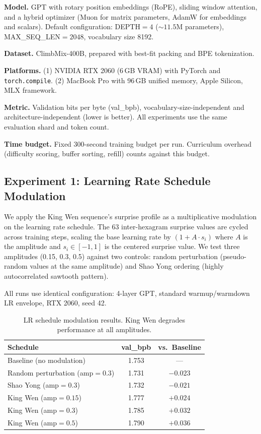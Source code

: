 \documentclass{article}
\begin{document}
\textbf{Model.} GPT with rotary position embeddings (RoPE), sliding window attention, and a hybrid optimizer (Muon for matrix parameters, AdamW for embeddings and scalars). Default configuration: DEPTH${}=4$ (${\sim}11.5$M parameters), MAX\_SEQ\_LEN${}=2048$, vocabulary size 8192.

\textbf{Dataset.} ClimbMix-400B, prepared with best-fit packing and BPE tokenization.

\textbf{Platforms.} (1) NVIDIA RTX 2060 (6\,GB VRAM) with PyTorch and \texttt{torch.compile}. (2) MacBook Pro with 96\,GB unified memory, Apple Silicon, MLX framework.

\textbf{Metric.} Validation bits per byte (val\_bpb), vocabulary-size-independent and architecture-independent (lower is better). All experiments use the same evaluation shard and token count.

\textbf{Time budget.} Fixed 300-second training budget per run. Curriculum overhead (difficulty scoring, buffer sorting, refill) counts against this budget.

\subsection{Experiment 1: Learning Rate Schedule Modulation}

We apply the King Wen sequence's surprise profile as a multiplicative modulation on the learning rate schedule. The 63 inter-hexagram surprise values are cycled across training steps, scaling the base learning rate by $(1 + A \cdot s_i)$ where $A$ is the amplitude and $s_i \in [-1, 1]$ is the centered surprise value. We test three amplitudes (0.15, 0.3, 0.5) against two controls: random perturbation (pseudo-random values at the same amplitude) and Shao Yong ordering (highly autocorrelated sawtooth pattern).

All runs use identical configuration: 4-layer GPT, standard warmup/warmdown LR envelope, RTX 2060, seed 42.

\begin{table}[h]
\centering
\begin{tabular}{lcc}
\toprule
\textbf{Schedule} & \textbf{val\_bpb} & \textbf{vs.\ Baseline} \\
\midrule
Baseline (no modulation) & 1.753 & --- \\
Random perturbation (amp${}=0.3$) & 1.731 & $-0.023$ \\
Shao Yong (amp${}=0.3$) & 1.732 & $-0.021$ \\
King Wen (amp${}=0.15$) & 1.777 & $+0.024$ \\
King Wen (amp${}=0.3$) & 1.785 & $+0.032$ \\
King Wen (amp${}=0.5$) & 1.790 & $+0.036$ \\
\bottomrule
\end{tabular}
\caption{LR schedule modulation results. King Wen degrades performance at all amplitudes.}
\label{tab:lr}
\end{table}
\end{document}
